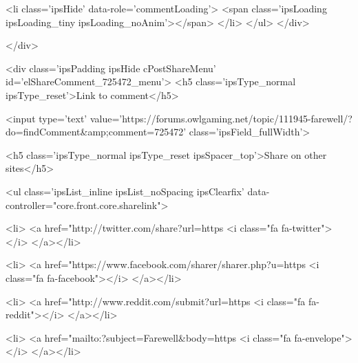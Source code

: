 						
						
					
					<li class='ipsHide' data-role='commentLoading'>
						<span class='ipsLoading ipsLoading_tiny ipsLoading_noAnim'></span>
					</li>
				</ul>
			</div>
		

		
			

		
	</div>

	

	



<div class='ipsPadding ipsHide cPostShareMenu' id='elShareComment_725472_menu'>
	<h5 class='ipsType_normal ipsType_reset'>Link to comment</h5>
	
		
	
	
	<input type='text' value='https://forums.owlgaming.net/topic/111945-farewell/?do=findComment&amp;comment=725472' class='ipsField_fullWidth'>

	
	<h5 class='ipsType_normal ipsType_reset ipsSpacer_top'>Share on other sites</h5>
	

	<ul class='ipsList_inline ipsList_noSpacing ipsClearfix' data-controller="core.front.core.sharelink">
		
			<li>
<a href="http://twitter.com/share?url=https%
	<i class="fa fa-twitter"></i>
</a></li>
		
			<li>
<a href="https://www.facebook.com/sharer/sharer.php?u=https%
	<i class="fa fa-facebook"></i>
</a></li>
		
			<li>
<a href="http://www.reddit.com/submit?url=https%
	<i class="fa fa-reddit"></i>
</a></li>
		
			<li>
<a href="mailto:?subject=Farewell&body=https%
	<i class="fa fa-envelope"></i>
</a></li>
		
